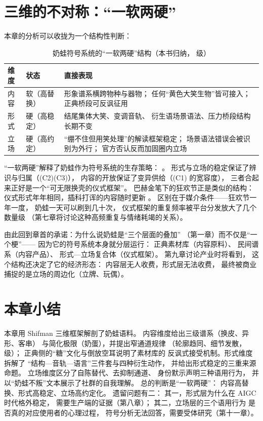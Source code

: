 \section{三维的不对称：“一软两硬”}\label{sec:06:asym}

本章的分析可以收拢为一个结构性判断：

\begin{table}[htbp]\centering
  \caption{奶蛙符号系统的“一软两硬”结构（本书归纳， 级）}
  \label{tab:06:asym}
  \small
  \begin{tabularx}{\textwidth}{@{}llX@{}}
    \toprule
    维度 & 状态 & 直接表现 \\ \midrule
    内容 & 软（高替换） &
      形象谱系横跨物种与器物；
      任何“黄色大笑生物”皆可接入；
      正典桥段可反讽征用 \\
    形式 & 硬（高稳定） &
      结尾集体大笑、变调音轨、
      衍生语场景语法、压力桥段结构长期不变 \\
    立场 & 硬（高约定） &
      “绷不住但用笑处理”的解读框架稳定；
      场景语法错误会被识别为外行；
      官方否认反而加固圈内立场 \\ \bottomrule
  \end{tabularx}
\end{table}

“一软两硬”解释了奶蛙作为符号系统的生存策略：
。
形式与立场的稳定保证了辨识与归属（(C2)(C3)），
内容的开放保证了变异供给（(C1) 的宽容度），
三者合起来正好是一个“可无限换壳的仪式框架”。
巴赫金笔下的狂欢节正是类似的结构：
仪式形式年年相同，插科打诨的内容随时更新
\cite{bakhtin1968rabelais}。
区别在于媒介条件——狂欢节一年一度，
奶蛙一天可以刷到几十次，
仪式框架的重复频率被平台分发放大了几个数量级
（第七章将讨论这种高频重复与情绪耗竭的关系）。

由此回到章首的承诺：为什么说奶蛙是“三个层面的叠加”
（第一章）而不仅是“一个梗”——
因为它的符号系统本身就分层运行：
正典素材库（内容原料）、
民间谱系（内容产品）、
形式—立场复合体（仪式框架）。
第九章讨论产业时将看到，
这个结构还决定了它的经济形态：
内容层无人收费，形式层无法收费，
最终被商业捕捉的是立场的周边化（立牌、玩偶）。

\section{本章小结}\label{sec:06:summary}

本章用 Shifman 三维框架解剖了奶蛙语料。
内容维度给出三级谱系（换皮、异形、客串）
与简化极限（奶蛋），并提出窄通道规律
（轮廓趋同、细节发散， 级）；
正典侧的“糖”文化与倒放空耳说明了素材库的
反讽式接受机制。形式维度拆解了
“结构—音轨—语言”三件套与四种衍生动作，
并给出形式稳定的三重来源命题。
立场维度区分了自陈替代、去抑制通道、
身份默示声明三种语用行为，
并以“奶蛙不叛”文本展示了社群的自我理解。
总的判断是“一软两硬”：
内容高替换、形式高稳定、立场高约定化。
遗留问题有二：
其一，形式层为什么在 AIGC 时代格外稳定，
需要生产端的证据（第八章）；
其二，立场层的三个语用行为
是否真的对应使用者的心理过程，
符号分析无法回答，需要受体研究（第十一章）。

